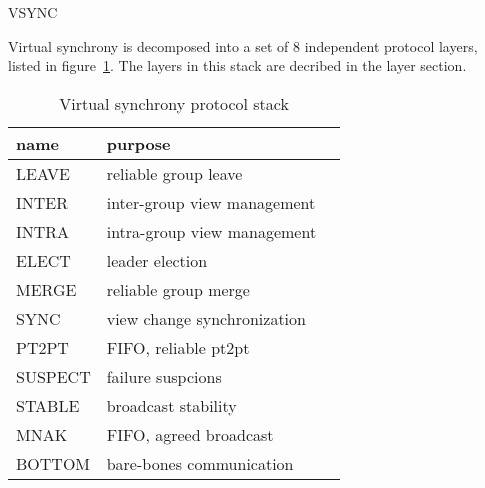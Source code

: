%
%
%
\begin{Stack}{VSYNC}

Virtual synchrony is decomposed into a set of 8 independent protocol
layers, listed in figure~\ref{vsynclayers}.  The layers in this stack are
decribed in the layer section.

\begin{table}[b]
\begin{center}
\begin{tabular}{|l|l|l|}			   \hline
name		& purpose			\\ \hline
LEAVE		& reliable group leave		\\ \hline
INTER		& inter-group view management	\\ \hline
INTRA		& intra-group view management	\\ \hline
ELECT		& leader election		\\ \hline
MERGE		& reliable group merge		\\ \hline
SYNC		& view change synchronization	\\ \hline
PT2PT		& FIFO, reliable pt2pt		\\ \hline
SUSPECT		& failure suspcions		\\ \hline
STABLE		& broadcast stability		\\ \hline
MNAK		& FIFO, agreed broadcast	\\ \hline
BOTTOM		& bare-bones communication	\\ \hline
\end{tabular}
\end{center}
\caption{Virtual synchrony protocol stack}
\label{vsynclayers}
\end{table}


\begin{Parameters}
\item {}
\end{Parameters}

\begin{Protocol}
\end{Protocol}


\end{Stack}
